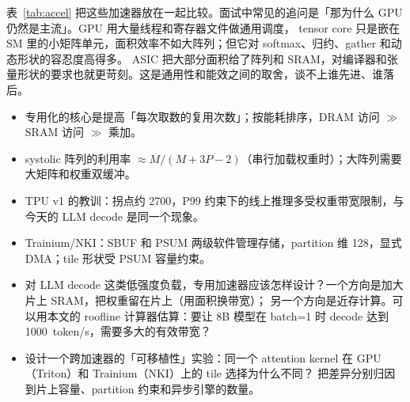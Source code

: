 表~\ref{tab:accel} 把这些加速器放在一起比较。面试中常见的追问是「那为什么 GPU 仍然是主流」。GPU 用大量线程和寄存器文件做通用调度，
tensor core 只是嵌在 SM 里的小矩阵单元，面积效率不如大阵列；但它对 softmax、归约、gather 和动态形状的容忍度高得多。
ASIC 把大部分面积给了阵列和 SRAM，对编译器和张量形状的要求也就更苛刻。这是通用性和能效之间的取舍，谈不上谁先进、谁落后。

\begin{keypts}
\begin{itemize}
\item 专用化的核心是提高「每次取数的复用次数」；按能耗排序，DRAM 访问 $\gg$ SRAM 访问 $\gg$ 乘加。
\item systolic 阵列的利用率 $\approx M/(M+3P-2)$（串行加载权重时）；大阵列需要大矩阵和权重双缓冲。
\item TPU v1 的教训：拐点约 2700，P99 约束下的线上推理多受权重带宽限制，与今天的 LLM decode 是同一个现象。
\item Trainium/NKI：SBUF 和 PSUM 两级软件管理存储，partition 维 128，显式 DMA；tile 形状受 PSUM 容量约束。
\end{itemize}
\end{keypts}

\begin{research}
\begin{itemize}
\item 对 LLM decode 这类低强度负载，专用加速器应该怎样设计？一个方向是加大片上 SRAM，把权重留在片上（用面积换带宽）；
另一个方向是近存计算。可以用本文的 roofline 计算器估算：要让 8B 模型在 batch=1 时 decode 达到 1000~token/s，需要多大的有效带宽？
\item 设计一个跨加速器的「可移植性」实验：同一个 attention kernel 在 GPU（Triton）和 Trainium（NKI）上的 tile 选择为什么不同？
把差异分别归因到片上容量、partition 约束和异步引擎的数量。
\end{itemize}
\end{research}

